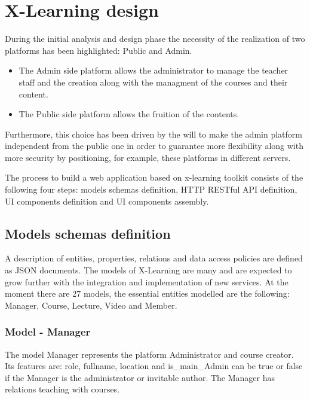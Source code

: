 \section{X-Learning design}
\label{sec:x-learning_design}

During the initial analysis and design phase the necessity of the realization of two platforms has been highlighted: Public and Admin.

\begin{itemize}
\item The Admin side platform allows the administrator to manage the teacher staff and the creation along with the managment of the courses and their content.

\item The Public side platform allows the fruition of the contents.
\end{itemize}

Furthermore, this choice has been driven by the will to make the admin platform independent from the public one in order to guarantee more flexibility along with more security by positioning, for example, these platforms in different servers.

The process to build a web application based on x-learning toolkit consists of the following four steps: models schemas definition, HTTP RESTful API definition, UI components definition and UI components  assembly.


\subsection {Models schemas definition}
\label{subsec:models_schemas_definitio}


A description of entities, properties, relations and data access policies are defined as JSON documents.
The models of X-Learning are many and are expected to grow further with the integration and implementation of new services. At the moment there are 27 models, the essential entities modelled are the following: Manager, Course, Lecture, Video and Member.


\subsubsection{ Model - Manager}

The model Manager represents the platform Administrator and course creator. Its features are: role, fullname, location and is\_main\_Admin can be true or false if the Manager is the administrator or invitable author. The Manager has relations teaching with courses.

